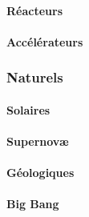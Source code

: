                 \paragraph{Réacteurs}
                \paragraph{Accélérateurs}
            \subsubsection{Naturels}
                \paragraph{Solaires}
                \paragraph{Supernov\ae}
                \paragraph{Géologiques}
                \paragraph{Big Bang}
    
\begin{subappendices}
    
    
    
    
\end{subappendices}
\printbibliography